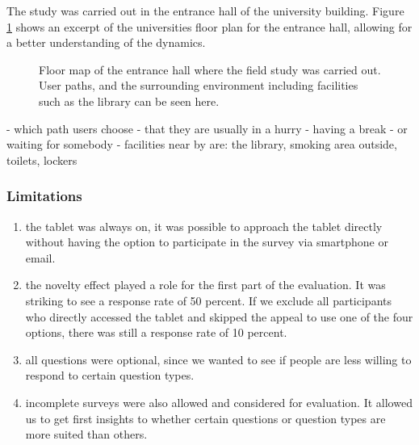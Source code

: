 	The study was carried out in the entrance hall of the university building. Figure \ref{fig:5-entrance-hall} shows an excerpt of the universities floor plan for the entrance hall, allowing for a better understanding of the dynamics.

	\begin{figure}
	    \begin{center}
	    \end{center}
	 \caption{Floor map of the entrance hall where the field study was carried out. User paths, and the surrounding environment including facilities such as the library can be seen here.}
	 \label{fig:5-entrance-hall}
	\end{figure}

	- which path users choose
	- that they are usually in a hurry
	- having a break
	- or waiting for somebody
	- facilities near by are: the library, smoking area outside, toilets, lockers



	\subsubsection{Limitations}

	\begin{enumerate}
	\item the tablet was always on, it was possible to approach the tablet directly without having the option to participate in the survey via smartphone or email. 
	\item the novelty effect played a role for the first part of the evaluation. It was striking to see a response rate of 50 percent. If we exclude all participants who directly accessed the tablet and skipped the appeal to use one of the four options, there was still a response rate of 10 percent.
	\item all questions were optional, since we wanted to see if people are less willing to respond to certain question types.
	\item incomplete surveys were also allowed and considered for evaluation. It allowed us to get first insights to whether certain questions or question types are more suited than others.
	\end{enumerate}

